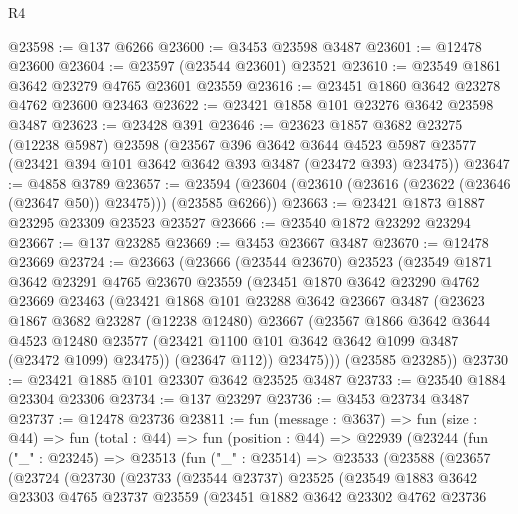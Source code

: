 \begin{lexlean}{R4}
\begin{coremodule}
@23598 := @137 @6266
@23600 := @3453 @23598 @3487
@23601 := @12478 @23600
@23604 := @23597 (@23544 @23601) @23521
@23610 := @23549 @1861 @3642 @23279 @4765 @23601 @23559
@23616 := @23451 @1860 @3642 @23278 @4762 @23600 @23463
@23622 := @23421 @1858 @101 @23276 @3642 @23598 @3487
@23623 := @23428 @391
@23646 := @23623
    @1857
    @3682
    @23275
    (@12238 @5987)
    @23598
    (@23567
      @396
      @3642
      @3644
      @4523
      @5987
      @23577
      (@23421 @394 @101 @3642 @3642 @393 @3487 (@23472 @393) @23475))
@23647 := @4858 @3789
@23657 := @23594 (@23604 (@23610 (@23616 (@23622 (@23646 (@23647 @50)) @23475))) (@23585 @6266))
@23663 := @23421 @1873 @1887 @23295 @23309 @23523 @23527
@23666 := @23540 @1872 @23292 @23294
@23667 := @137 @23285
@23669 := @3453 @23667 @3487
@23670 := @12478 @23669
@23724 := @23663
    (@23666
      (@23544 @23670)
      @23523
      (@23549
        @1871
        @3642
        @23291
        @4765
        @23670
        @23559
        (@23451
          @1870
          @3642
          @23290
          @4762
          @23669
          @23463
          (@23421
            @1868
            @101
            @23288
            @3642
            @23667
            @3487
            (@23623
              @1867
              @3682
              @23287
              (@12238 @12480)
              @23667
              (@23567
                @1866
                @3642
                @3644
                @4523
                @12480
                @23577
                (@23421 @1100 @101 @3642 @3642 @1099 @3487 (@23472 @1099) @23475))
              (@23647 @112))
            @23475)))
      (@23585 @23285))
@23730 := @23421 @1885 @101 @23307 @3642 @23525 @3487
@23733 := @23540 @1884 @23304 @23306
@23734 := @137 @23297
@23736 := @3453 @23734 @3487
@23737 := @12478 @23736
@23811 := fun (message : @3637) =>
  fun (size : @44) =>
  fun (total : @44) =>
  fun (position : @44) =>
  @22939
    (@23244
      (fun ("_" : @23245) =>
      @23513
        (fun ("_" : @23514) =>
        @23533
          (@23588
            (@23657
              (@23724
                (@23730
                  (@23733
                    (@23544 @23737)
                    @23525
                    (@23549
                      @1883
                      @3642
                      @23303
                      @4765
                      @23737
                      @23559
                      (@23451
                        @1882
                        @3642
                        @23302
                        @4762
                        @23736

\end{coremodule}
\end{lexlean}
